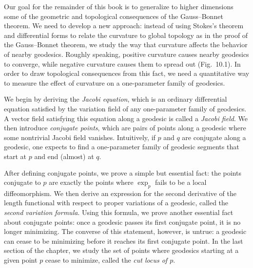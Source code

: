 
Our goal for the remainder of this book is to generalize to higher dimensions some of the geometric and topological consequences of the Gauss--Bonnet theorem. We need to develop a new approach: instead of using Stokes's theorem and differential forms to relate the curvature to global topology as in the proof of the Gauss--Bonnet theorem, we study the way that curvature affects the behavior of nearby geodesics. Roughly speaking, positive curvature causes nearby geodesics to converge, while negative curvature causes them to spread out (Fig.~10.1). In order to draw topological consequences from this fact, we need a quantitative way to measure the effect of curvature on a one-parameter family of geodesics.

We begin by deriving the \emph{Jacobi equation}, which is an ordinary differential equation satisfied by the variation field of any one-parameter family of geodesics. A vector field satisfying this equation along a geodesic is called a \emph{Jacobi field}. We then introduce \emph{conjugate points}, which are pairs of points along a geodesic where some nontrivial Jacobi field vanishes. Intuitively, if $p$ and $q$ are conjugate along a geodesic, one expects to find a one-parameter family of geodesic segments that start at $p$ and end (almost) at $q$.

After defining conjugate points, we prove a simple but essential fact: the points conjugate to $p$ are exactly the points where $\exp_p$ fails to be a local diffeomorphism. We then derive an expression for the second derivative of the length functional with respect to proper variations of a geodesic, called the \emph{second variation formula}. Using this formula, we prove another essential fact about conjugate points: once a geodesic passes its first conjugate point, it is no longer minimizing. The converse of this statement, however, is untrue: a geodesic can cease to be minimizing before it reaches its first conjugate point. In the last section of the chapter, we study the set of points where geodesics starting at a given point $p$ cease to minimize, called the \emph{cut locus of $p$}.

